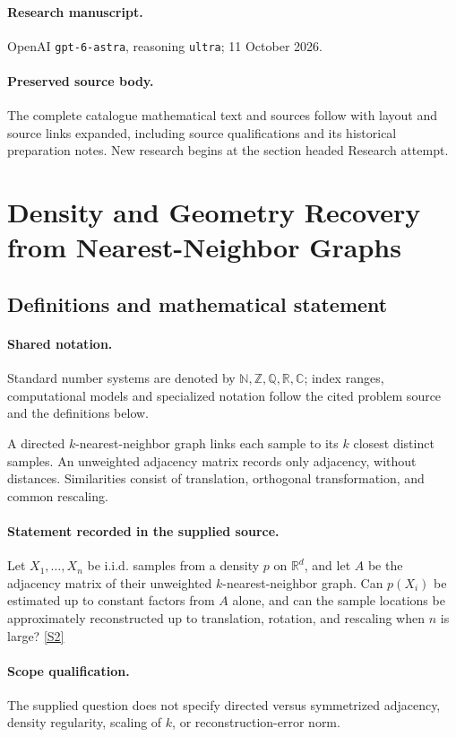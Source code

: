 \documentclass[11pt]{article}
\begin{document}
\paragraph{Research manuscript.} OpenAI \texttt{gpt-6-astra}, reasoning \texttt{ultra}; 11 October 2026.
\paragraph{Preserved source body.} The complete catalogue mathematical text and sources follow with layout and source links expanded, including source qualifications and its historical preparation notes. New research begins at the section headed Research attempt.

\section{Density and Geometry Recovery from Nearest-Neighbor Graphs}\label{statement}

\subsection{Definitions and mathematical statement}

\paragraph{Shared notation.}Standard number systems are denoted by $\mathbb N,\mathbb Z,\mathbb Q,\mathbb R,\mathbb C$; index ranges, computational models and specialized notation follow the cited problem source and the definitions below.


A directed $k$-nearest-neighbor graph links each sample to its $k$ closest distinct samples. An unweighted adjacency matrix records only adjacency, without distances. Similarities consist of translation, orthogonal transformation, and common rescaling.
\paragraph{Statement recorded in the supplied source.}
Let $X_1,\ldots,X_n$ be i.i.d. samples from a density $p$ on $\mathbb R^d$, and let $A$ be the adjacency matrix of their unweighted $k$-nearest-neighbor graph. Can $p(X_i)$ be estimated up to constant factors from $A$ alone, and can the sample locations be approximately reconstructed up to translation, rotation, and rescaling when $n$ is large? \href{https://doi.org/10.4171/owr/2012/31}{[S2]}
\paragraph{Scope qualification.}
The supplied question does not specify directed versus symmetrized adjacency, density regularity, scaling of $k$, or reconstruction-error norm.
\end{document}
